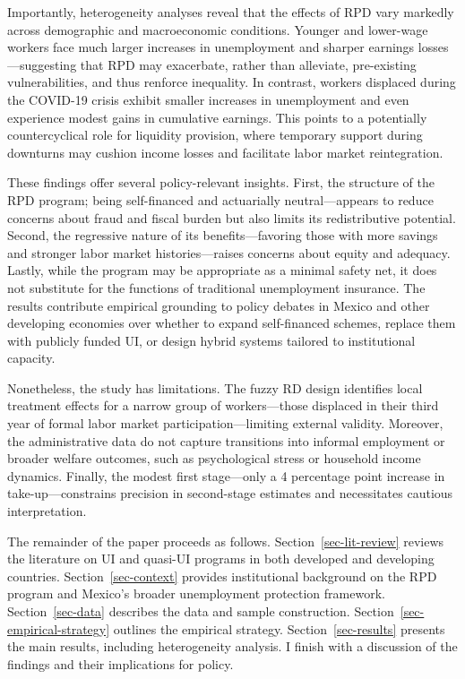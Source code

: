 \documentclass[
  4pt,
]{report}
\begin{document}
Importantly, heterogeneity analyses reveal that the effects of RPD vary
markedly across demographic and macroeconomic conditions. Younger and
lower-wage workers face much larger increases in unemployment and
sharper earnings losses---suggesting that RPD may exacerbate, rather
than alleviate, pre-existing vulnerabilities, and thus renforce
inequality. In contrast, workers displaced during the COVID-19 crisis
exhibit smaller increases in unemployment and even experience modest
gains in cumulative earnings. This points to a potentially
countercyclical role for liquidity provision, where temporary support
during downturns may cushion income losses and facilitate labor market
reintegration.

These findings offer several policy-relevant insights. First, the
structure of the RPD program; being self-financed and actuarially
neutral---appears to reduce concerns about fraud and fiscal burden but
also limits its redistributive potential. Second, the regressive nature
of its benefits---favoring those with more savings and stronger labor
market histories---raises concerns about equity and adequacy. Lastly,
while the program may be appropriate as a minimal safety net, it does
not substitute for the functions of traditional unemployment insurance.
The results contribute empirical grounding to policy debates in Mexico
and other developing economies over whether to expand self-financed
schemes, replace them with publicly funded UI, or design hybrid systems
tailored to institutional capacity.

Nonetheless, the study has limitations. The fuzzy RD design identifies
local treatment effects for a narrow group of workers---those displaced
in their third year of formal labor market participation---limiting
external validity. Moreover, the administrative data do not capture
transitions into informal employment or broader welfare outcomes, such
as psychological stress or household income dynamics. Finally, the
modest first stage---only a 4 percentage point increase in
take-up---constrains precision in second-stage estimates and
necessitates cautious interpretation.

The remainder of the paper proceeds as follows.
Section~\ref{sec-lit-review} reviews the literature on UI and quasi-UI
programs in both developed and developing countries.
Section~\ref{sec-context} provides institutional background on the RPD
program and Mexico's broader unemployment protection framework.
Section~\ref{sec-data} describes the data and sample construction.
Section~\ref{sec-empirical-strategy} outlines the empirical strategy.
Section~\ref{sec-results} presents the main results, including
heterogeneity analysis. I finish with a discussion of the findings and
their implications for policy.
\end{document}
